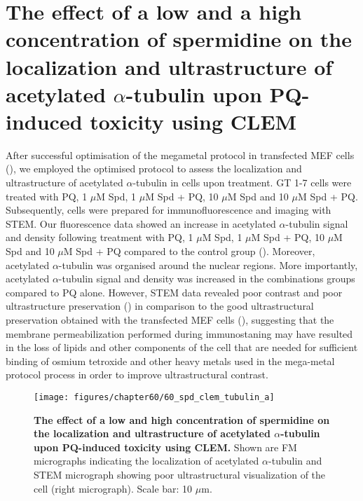 \section{The effect of a low and a high concentration of spermidine on the localization and ultrastructure of acetylated $\alpha$-tubulin upon PQ-induced toxicity using CLEM}
\label{sec:Effect_low_high_spermidine_localization_ultrastructure of_tubulin_CLEM}
After successful optimisation of the megametal protocol in transfected MEF cells (), we employed the optimised protocol to assess the localization and ultrastructure of acetylated $\alpha$-tubulin in cells upon treatment. GT 1-7 cells were treated with PQ, 1 $\mu$M Spd,  1 $\mu$M Spd + PQ, 10 $\mu$M Spd and 10 $\mu$M Spd + PQ. Subsequently, cells were prepared for immunofluorescence and imaging with STEM. Our fluorescence data showed an increase in acetylated $\alpha$-tubulin signal and density following treatment with PQ, 1 $\mu$M Spd, 1 $\mu$M Spd + PQ, 10 $\mu$M Spd and 10 $\mu$M Spd + PQ compared to the control group ().  Moreover, acetylated  $\alpha$-tubulin was  organised around the nuclear regions. More importantly, acetylated $\alpha$-tubulin signal and density was increased in the combinations groups compared to PQ alone. However, STEM data revealed poor contrast and poor ultrastructure preservation () in comparison to the good ultrastructural preservation obtained with the transfected MEF cells (), suggesting that the membrane permeabilization performed during immunostaning may have resulted in the loss of lipids and other components of the cell that are needed for sufficient binding of osmium tetroxide and other heavy metals used in the mega-metal protocol process in order to improve ultrastructural contrast. 

\begin{landscape}
\begin{figure}[!htbp]
\center
  \texttt{[image: figures/chapter60/60\_spd\_clem\_tubulin\_a]}
  \caption[The effect of a low and high concentration of spermidine on the localization and ultrastructure of acetylated $\alpha$-tubulin upon PQ-induced toxicity using CLEM]{\textbf{The effect of a low and high concentration of spermidine on the localization and ultrastructure of acetylated $\alpha$-tubulin upon PQ-induced toxicity using CLEM.} Shown are FM micrographs indicating the localization of acetylated $\alpha$-tubulin and STEM micrograph showing poor ultrastructural visualization of the cell (right micrograph). Scale bar: 10 $\mu$m.}
  \label{fig:60_spd_clem_tubulin_a}
\end{figure} 
\end{landscape}

